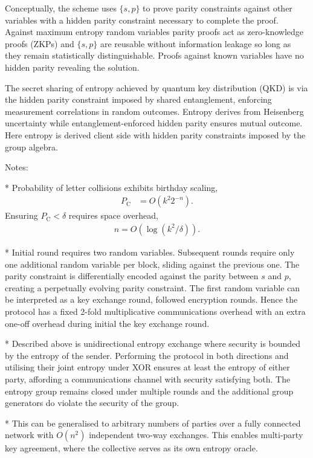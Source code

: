 \documentclass[twocolumn, aps, amsmath, amssymb, nofootinbib, superscriptaddress, longbibliography, doublefloatfix, table-of-contents, eqsecnum, rmp]{revtex4-2}
\begin{document}

Conceptually, the scheme uses $\{s,p\}$ to prove parity constraints against other variables with a hidden parity constraint necessary to complete the proof. Against maximum entropy random variables parity proofs act as zero-knowledge proofs (ZKPs) and $\{s,p\}$ are reusable without information leakage so long as they remain statistically distinguishable. Proofs against known variables have no hidden parity revealing the solution.

The secret sharing of entropy achieved by quantum key distribution (QKD) is via the hidden parity constraint imposed by shared entanglement, enforcing measurement correlations in random outcomes. Entropy derives from Heisenberg uncertainty while entanglement-enforced hidden parity ensures mutual outcome. Here entropy is derived client side with hidden parity constraints imposed by the group algebra.

Notes:

* Probability of letter collisions exhibits birthday scaling,
\begin{align}
	P_\mathrm{C} &= O(k^2 2^{-n}).
\end{align}
Ensuring $P_\mathrm{C}< \delta$ requires space overhead,
\begin{align}
	n = O(\log(k^2/\delta)).
\end{align}

* Initial round requires two random variables. Subsequent rounds require only one additional random variable per block,  sliding against the previous one. The parity constraint is differentially encoded against the parity between $s$ and $p$, creating a perpetually evolving parity constraint. The first random variable can be interpreted as a key exchange round, followed encryption rounds. Hence the protocol has a fixed 2-fold multiplicative communications overhead with an extra one-off overhead during initial the key exchange round.

* Described above is unidirectional entropy exchange where security is bounded by the entropy of the sender. Performing the protocol in both directions and utilising their joint entropy under XOR ensures at least the entropy of either party, affording a communications channel with security satisfying both. The entropy group remains closed under multiple rounds and the additional group generators do violate the security of the group.

* This can be generalised to arbitrary numbers of parties over a fully connected network with $O(n^2)$ independent two-way exchanges. This enables multi-party key agreement, where the collective serves as its own entropy oracle.
\end{document}
